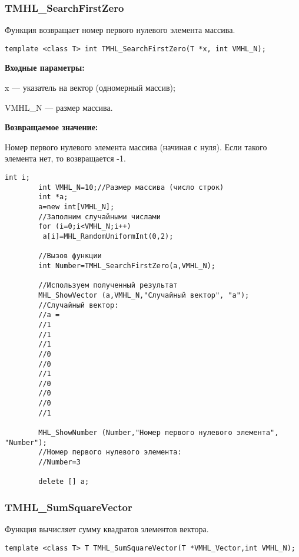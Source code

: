 \documentclass[a4paper,12pt]{article}
\begin{document}
\subsubsection{TMHL\_SearchFirstZero}\label{TMHL_SearchFirstZero}

Функция возвращает номер первого нулевого элемента массива.


\begin{lstlisting}[label=code_syntax_TMHL_SearchFirstZero,caption=Синтаксис]
template <class T> int TMHL_SearchFirstZero(T *x, int VMHL_N);
\end{lstlisting}

\textbf{Входные параметры:}

 x --- указатель на вектор (одномерный массив);
 
 VMHL\_N --- размер массива.

\textbf{Возвращаемое значение:}

 Номер первого нулевого элемента массива (начиная с нуля). Если такого элемента нет, то возвращается -1.


\begin{lstlisting}[label=code_use_TMHL_SearchFirstZero,caption=Пример использования]
        int i;
        int VMHL_N=10;//Размер массива (число строк)
        int *a;
        a=new int[VMHL_N];
        //Заполним случайными числами
        for (i=0;i<VMHL_N;i++)
         a[i]=MHL_RandomUniformInt(0,2);

        //Вызов функции
        int Number=TMHL_SearchFirstZero(a,VMHL_N);

        //Используем полученный результат
        MHL_ShowVector (a,VMHL_N,"Случайный вектор", "a");
        //Случайный вектор:
        //a =
        //1
        //1
        //1
        //0
        //0
        //1
        //0
        //0
        //0
        //1

        MHL_ShowNumber (Number,"Номер первого нулевого элемента", "Number");
        //Номер первого нулевого элемента:
        //Number=3

        delete [] a;
\end{lstlisting}

\subsubsection{TMHL\_SumSquareVector}\label{TMHL_SumSquareVector}

Функция вычисляет сумму квадратов элементов вектора.


\begin{lstlisting}[label=code_syntax_TMHL_SumSquareVector,caption=Синтаксис]
template <class T> T TMHL_SumSquareVector(T *VMHL_Vector,int VMHL_N);
\end{lstlisting}
\end{document}
